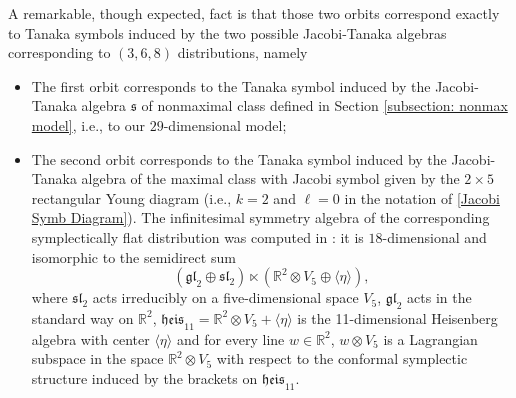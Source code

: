 \documentclass[11pt,letterpaper]{amsart}
\numberwithin{equation}{section}
\begin{document}
A remarkable, though expected, fact is that those two orbits correspond exactly to Tanaka symbols induced by the two possible Jacobi-Tanaka algebras corresponding to $(3,6,8)$ distributions, namely 
\begin{itemize}
\item The first orbit corresponds to the Tanaka symbol 
induced by the Jacobi-Tanaka algebra $\mathfrak s$ of nonmaximal class defined in Section \ref{subsection: nonmax model}, i.e., to our  $29$-dimensional model;
\item The second orbit corresponds to the Tanaka symbol induced by the Jacobi-Tanaka algebra of the maximal class  with Jacobi symbol given by the $2\times 5$ rectangular Young diagram (i.e., $k=2$ and $\ell=0$ in the notation of \eqref{Jacobi Symb Diagram}). The infinitesimal symmetry algebra of the corresponding symplectically flat distribution was computed in \cite{doubrov2008rank3}: it is $18$-dimensional and isomorphic to the semidirect sum $$(\mathfrak{gl}_2 \oplus  \mathfrak{sl}_2)\ltimes (\mathbb R^2\otimes V_5\oplus\langle \eta\rangle),$$ where  $\mathfrak{sl}_2$ acts irreducibly on a five-dimensional space $V_5$, $\mathfrak{gl}_2$ acts in the standard way on $\mathbb R^2$, $\mathfrak{heis}_{11}=\mathbb R^2\otimes V_5+\langle \eta\rangle$  is the 11-dimensional Heisenberg algebra with center $\langle \eta\rangle$ and for every line $w \in\mathbb R^2$,  $w\otimes V_5$ is a Lagrangian  subspace in the space $\mathbb R^2\otimes V_5$ with respect to the conformal symplectic structure induced by the brackets on $\mathfrak{heis}_{11}$.  
\end{itemize} 


\end{document}
